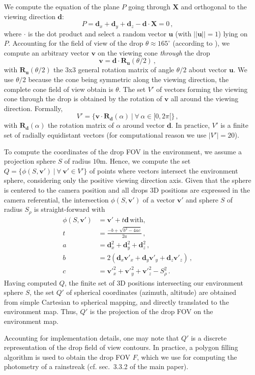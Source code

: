 We compute the equation of the plane $P$ going through $\mathbf{X}$ and orthogonal to the viewing direction $\mathbf{d}$:
\begin{equation}
P = \mathbf{d}_x+\mathbf{d}_y+\mathbf{d}_z-\mathbf{d}\cdot\mathbf{X} = 0\,,
\end{equation}
where $\cdot$ is the dot product and select a random vector $\mathbf{u}$ (with $||\mathbf{u}|| = 1$) lying on $P$. 
Accounting for the field of view of the drop $\theta\approx165^\circ$ (according to \cite{garg2007vision}), we compute an arbitrary vector $\mathbf{v}$ on the viewing cone \textit{through} the drop
\begin{equation}
\mathbf{v} = \mathbf{d}\cdot\mathbf{R}_{\mathbf{u}}(\theta/2)\,,
\end{equation}
with $\mathbf{R}_{\mathbf{u}}(\theta/2)$ the 3x3 general rotation matrix of angle $\theta/2$ about vector $\mathbf{u}$. 
We use $\theta/2$ because the cone being symmetric along the viewing direction, the complete cone field of view obtain is $\theta$. 
The set $V'$ of vectors forming the viewing cone through the drop is obtained by the rotation of $\mathbf{v}$ all around the viewing direction. Formally,
\begin{equation}
V' = \{\mathbf{v}\cdot\mathbf{R}_{\mathbf{d}}(\alpha) ~| ~\forall ~\alpha \in [0, 2\pi[\}\,,
\end{equation}
with $\mathbf{R}_{\mathbf{d}}(\alpha)$ the rotation matrix of $\alpha$ around vector $\mathbf{d}$. In practice, $V'$ is a finite set of radially equidistant vectors (for computational reason we use $|V'| = 20$).

To compute the coordinates of the drop FOV in the environment, we assume a projection sphere $S$ of radius $10$m. Hence, we compute the set $Q = \{\phi(S, \mathbf{v'}) ~| ~\forall ~\mathbf{v'} \in V'\}$ of points where vectors intersect the environment sphere, considering only the positive viewing direction axis. 
Given that the sphere is centered to the camera position and all drops 3D positions are expressed in the camera referential, the intersection $\phi(S, \mathbf{v'})$ of a vector $\mathbf{v'}$ and sphere $S$ of radius $S_{\rho}$ is straight-forward with
\begin{equation}
\begin{split}
\phi(S, \mathbf{v'}) &= \mathbf{v'} + t\mathbf{d}\,\text{with},\\
t &= \frac{-b + \sqrt{b^2 - 4ac}}{2a}\,,\\
a &= \mathbf{d}_x^2 + \mathbf{d}_y^2 + \mathbf{d}_z^2\,,\\
b &= 2(\mathbf{d}_x\mathbf{v'}_x + \mathbf{d}_y\mathbf{v'}_y + \mathbf{d}_z\mathbf{v'}_z)\,,\\
c &= \mathbf{v'}_x^2 + \mathbf{v'}_y^2 + \mathbf{v'}_z^2 - S_{\rho}^2\,.
\end{split}
\label{eq:sphere-ray-intersection}
\end{equation}
Having computed $Q$, the finite set of 3D positions intersecting our environment sphere $S$, the set $Q'$ of spherical coordinates (azimuth, altitude) are obtained from simple Cartesian to spherical mapping, and directly translated to the environment map. 
Thus, $Q'$ is the projection of the drop FOV on the environment map.

Accounting for implementation details, one may note that $Q'$ is a discrete representation of the drop field of view contours. In practice, a polygon filling algorithm is used to obtain the drop FOV $F$, which we use for computing the photometry of a rainstreak (cf. sec.~3.3.2 of the main paper).

